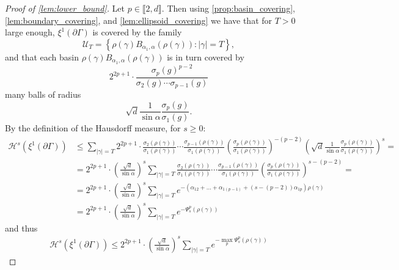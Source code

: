 \documentclass{report}
\begin{document}
\begin{proof}[Proof of \cref*{lem:lower_bound}]
Let $p \in \llbracket 2, d \rrbracket$.
Then using \cref{prop:basin_covering}, \cref{lem:boundary_covering}, and \cref{lem:ellipsoid_covering} we have that for $T>0$ large enough, $\xi^1(\partial \Gamma)$ is covered by the family
\[
    \mathcal U_T = \left\{ \rho(\gamma) B_{\alpha_1, \alpha}(\rho(\gamma)) : |\gamma| = T \right\},
\]
and that each basin $\rho(\gamma) B_{\alpha_1, \alpha}(\rho(\gamma))$ is in turn covered by
\[
    2^{2p+1} \cdot \frac{\sigma_p(g)^{p-2}}{\sigma_2(g) \cdots \sigma_{p-1}(g)}
\]
many balls of radius
\[
    \sqrt{d} \frac{1}{\sin \alpha} \frac{\sigma_p(g)}{\sigma_1(g)}.
\]
By the definition of the Hausdorff measure, for $s \geq 0$:
\begin{align*}
    \mathcal H^s(\xi^1(\partial \Gamma)) &\leq
    \sum_{|\gamma| = T}
        2^{2p+1} \cdot 
        \frac{\sigma_2(\rho(\gamma))}{\sigma_1(\rho(\gamma))} \cdots 
            \frac{\sigma_{p-1}(\rho(\gamma))}{\sigma_1(\rho(\gamma))}
        \left(
            \frac{\sigma_p(\rho(\gamma))}{\sigma_1(\rho(\gamma))}
        \right)^{-(p-2)}
        \left(
            \sqrt{d} \frac{1}{\sin \alpha} \frac{\sigma_p(\rho(\gamma))}{\sigma_1(\rho(\gamma))}
        \right)^s =\\
        &=
        2^{2p+1} \cdot \left( \frac{\sqrt{d}}{\sin \alpha}\right)^s  
        \sum_{|\gamma| = T} 
        \frac{\sigma_2(\rho(\gamma))}{\sigma_1(\rho(\gamma))} \cdots 
            \frac{\sigma_{p-1}(\rho(\gamma))}{\sigma_1(\rho(\gamma))}
        \left(
            \frac{\sigma_p(\rho(\gamma))}{\sigma_1(\rho(\gamma))}
        \right)^{s-(p-2)} =\\
        &=
        2^{2p+1} \cdot \left( \frac{\sqrt{d}}{\sin \alpha}\right)^s  
        \sum_{|\gamma| = T}
        e^{-\left( \alpha_{1 2} + \ldots + \alpha_{1 (p-1)} + (s - (p-2))\alpha_{1 p} \right)\rho(\gamma)}\\
        &=
        2^{2p+1} \cdot \left( \frac{\sqrt{d}}{\sin \alpha}\right)^s  
        \sum_{|\gamma| = T}
        e^{-\Psi_s^p(\rho(\gamma))}
\end{align*}
and thus
\begin{align*}
    \mathcal H^s(\xi^1(\partial \Gamma)) \leq
    2^{2p+1} \cdot \left( \frac{\sqrt{d}}{\sin \alpha}\right)^s
    \sum_{|\gamma| = T}
    e^{-\max_p \Psi_s^p(\rho(\gamma)) }
\end{align*} 
\end{proof}
\end{document}
